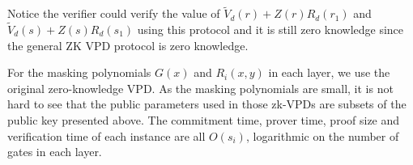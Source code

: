 Notice the verifier could verify the value of $\tilde{V}_d(r) + Z(r)R_d(r_1)$ and $\tilde{V}_d(s) + Z(s)R_d(s_1)$ using this protocol and it is still zero knowledge since the general ZK VPD protocol is zero knowledge. 

For the masking polynomials $G(x)$ and $R_i(x,y)$ in each layer, we use the original zero-knowledge VPD. As the masking polynomials are small, it is not hard to see that the public parameters used in those zk-VPDs are subsets of the public key presented above. The commitment time, prover time, proof size and verification time of each instance are all $O(s_i)$, logarithmic on the number of gates in each layer. 









